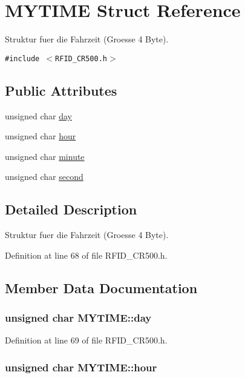 \hypertarget{struct_m_y_t_i_m_e}{
\section{MYTIME Struct Reference}
\label{struct_m_y_t_i_m_e}
}
Struktur fuer die Fahrzeit (Groesse 4 Byte).  


{\tt \#include $<$RFID\_\-CR500.h$>$}

\subsection*{Public Attributes}
\begin{CompactItemize}
\item 
unsigned char \hyperlink{struct_m_y_t_i_m_e_addb0c3b6851d8c8448b95ba4f1a3d27}{day}
\item 
unsigned char \hyperlink{struct_m_y_t_i_m_e_bff85b8be85da96ffdb6b3b2a21088aa}{hour}
\item 
unsigned char \hyperlink{struct_m_y_t_i_m_e_8033dc39f4e81961d8b11ce373dbbd56}{minute}
\item 
unsigned char \hyperlink{struct_m_y_t_i_m_e_41ed7eedee0633eb8cd09672665c9c0c}{second}
\end{CompactItemize}


\subsection{Detailed Description}
Struktur fuer die Fahrzeit (Groesse 4 Byte). 

Definition at line 68 of file RFID\_\-CR500.h.

\subsection{Member Data Documentation}
\hypertarget{struct_m_y_t_i_m_e_addb0c3b6851d8c8448b95ba4f1a3d27}{
\subsubsection[day]{\setlength{\rightskip}{0pt plus 5cm}unsigned char {\bf MYTIME::day}}}
\label{struct_m_y_t_i_m_e_addb0c3b6851d8c8448b95ba4f1a3d27}




Definition at line 69 of file RFID\_\-CR500.h.\hypertarget{struct_m_y_t_i_m_e_bff85b8be85da96ffdb6b3b2a21088aa}{
\subsubsection[hour]{\setlength{\rightskip}{0pt plus 5cm}unsigned char {\bf MYTIME::hour}}}
\label{struct_m_y_t_i_m_e_bff85b8be85da96ffdb6b3b2a21088aa}





